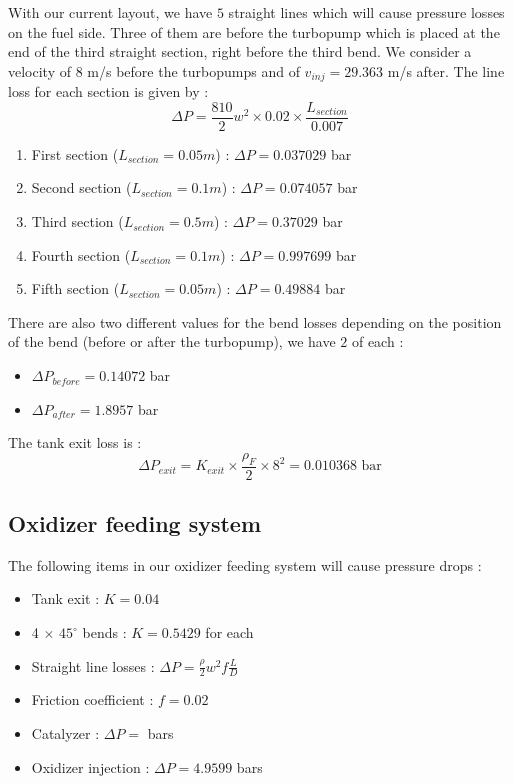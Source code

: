 With our current layout, we have $5$ straight lines which will cause pressure losses on the fuel side. Three of them are before the turbopump which is placed at the end of the third straight section, right before the third bend. We consider a velocity of $8$ m/s before the turbopumps and of $v_{inj}=29.363$ m/s after. The line loss for each section is given by : 
$$
\Delta P = \frac {810} 2 w^2 \times 0.02 \times \frac{L_{section}}{0.007}
$$
\begin{enumerate}
	\item First section ($L_{section}=0.05m$) : $\Delta P = 0.037029$ bar
	\item Second section ($L_{section}=0.1m$) : $\Delta P = 0.074057$ bar
	\item Third section ($L_{section}=0.5m$) : $\Delta P = 0.37029$ bar
	\item Fourth section ($L_{section}=0.1m$) : $\Delta P = 0.997699$ bar
	\item Fifth section ($L_{section}=0.05m$) : $\Delta P = 0.49884$ bar
\end{enumerate}
There are also two different values for the bend losses depending on the position of the bend (before or after the turbopump), we have $2$ of each :
\begin{itemize}
	\item $\Delta P_{before} = 0.14072 $ bar
	\item $\Delta P_{after} = 1.8957$ bar
\end{itemize}
The tank exit loss is :
$$
\Delta P_{exit} = K_{exit} \times \frac{\rho_F}2 \times 8 ^ 2 = 0.010368\text{ bar}
$$
\subsection{Oxidizer feeding system}
The following items in our oxidizer feeding system will cause pressure drops :
\begin{itemize}
	\item Tank exit : $K=0.04$
	\item 4 $\times$ $45^\circ$ bends : $K = 0.5429$ for each
	\item Straight line losses : $\Delta P = \frac \rho 2 w^2 f \frac{L}{D}$
	\item Friction coefficient : $f = 0.02$
	\item Catalyzer : $\Delta P = $ bars
	\item Oxidizer injection : $\Delta P = 4.9599$ bars
\end{itemize}

